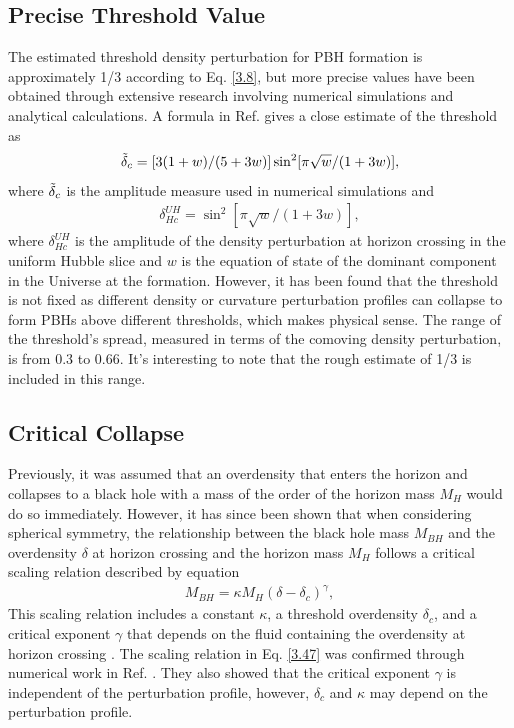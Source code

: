 \subsection{Precise Threshold Value}
The estimated threshold density perturbation for PBH formation is approximately 1/3 according to Eq. \ref{3.8}, but more precise values have been obtained through extensive research involving numerical simulations and analytical calculations. A formula in Ref. \cite{Harada_2013} gives a close estimate of the threshold as
\begin{align}
    \Tilde{\delta}_c =[3(1+w)/(5+3w)] \sin ^2[\pi \sqrt{w} /(1+3 w)], \label{3.45}
\end{align}
where $\Tilde{\delta}_c$ is the amplitude measure used in
numerical simulations and
\begin{align}
    \delta_{H c}^{UH}=\sin ^2[\pi \sqrt{w} /(1+3 w)] ,\label{3.46}
 \end{align}
 where $\delta_{H c}^{UH}$ is the amplitude of the density perturbation at horizon crossing in the uniform Hubble slice and $w$ is the equation of state of the dominant component in the Universe at the formation. However, it has been found that the threshold is not fixed as different density or curvature perturbation profiles can collapse to form PBHs above different thresholds, which makes physical sense. The range of the threshold's spread, measured in terms of the comoving density perturbation, is from 0.3 to 0.66. It's interesting to note that the rough estimate of 1/3 is included in this range.
 \subsection{Critical Collapse}

\hspace{0.5cm}Previously, it was assumed that an overdensity that enters the horizon and collapses to a black hole with a mass of the order of the horizon mass $M_{H}$ would do so immediately. However, it has since been shown that when considering spherical symmetry, the relationship between the black hole mass $M_{BH}$ and the overdensity $\delta$ at horizon crossing and the horizon mass $M_{H}$ follows a critical scaling relation described by equation 
 \begin{align}
     M_{BH} = \kappa M_{H}(\delta -\delta_{c})^\gamma \label{3.47},
 \end{align} 
 This scaling relation includes a constant $\kappa$, a threshold overdensity $\delta_{c}$, and a critical exponent $\gamma$ that depends on the fluid containing the overdensity at horizon crossing \cite{Musco_2013}. The scaling relation in Eq. \ref{3.47} was confirmed  through numerical work in Ref. \cite{Musco_2013}. They also showed that the critical exponent $\gamma$ is independent of the perturbation profile, however, $\delta_{c}$ and $\kappa$ may depend on the perturbation profile.\\

